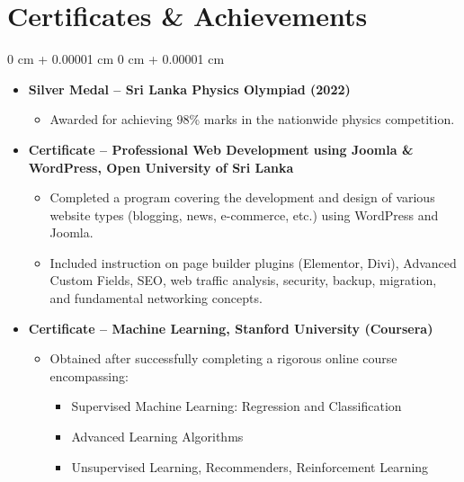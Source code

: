 \documentclass[10pt, letterpaper]{article}
\newenvironment{highlights}{
	\begin{itemize}[
		topsep=0.10 cm,
		parsep=0.10 cm,
		partopsep=0pt,
		itemsep=0pt,
		leftmargin=0 cm + 10pt
		]
	}{
	\end{itemize}
} %
\newenvironment{onecolentry}{
	\begin{adjustwidth}{
			0 cm + 0.00001 cm
		}{
			0 cm + 0.00001 cm
		}
	}{
	\end{adjustwidth}
} %
\begin{document}
	\section{Certificates \& Achievements}
       \begin{onecolentry}
       	\begin{highlights}
       		\item \textbf{Silver Medal – Sri Lanka Physics Olympiad (2022)}
       		\begin{itemize}
       			\item Awarded for achieving 98\% marks in the nationwide physics competition.
       		\end{itemize}
       		\item \textbf{Certificate – Professional Web Development using Joomla \& WordPress, Open University of Sri Lanka}
       		\begin{itemize}
       			\item Completed a program covering the development and design of various website types (blogging, news, e-commerce, etc.) using WordPress and Joomla.
       			\item Included instruction on page builder plugins (Elementor, Divi), Advanced Custom Fields, SEO, web traffic analysis, security, backup, migration, and fundamental networking concepts.
       		\end{itemize}
       		\item \textbf{Certificate – Machine Learning, Stanford University (Coursera)}
       		\begin{itemize}
       			\item Obtained after successfully completing a rigorous online course encompassing:
       			\begin{itemize}
       				\item Supervised Machine Learning: Regression and Classification
       				\item Advanced Learning Algorithms
       				\item Unsupervised Learning, Recommenders, Reinforcement Learning
       			\end{itemize}
       		\end{itemize}
       	\end{highlights}
       \end{onecolentry}
	
\end{document}
